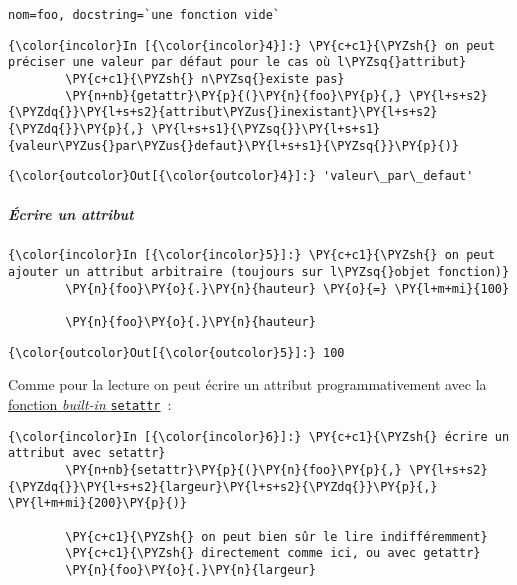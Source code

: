     \begin{Verbatim}[commandchars=\\\{\}]
nom=foo, docstring=`une fonction vide`

    \end{Verbatim}

    \begin{Verbatim}[commandchars=\\\{\}]
{\color{incolor}In [{\color{incolor}4}]:} \PY{c+c1}{\PYZsh{} on peut préciser une valeur par défaut pour le cas où l\PYZsq{}attribut}
        \PY{c+c1}{\PYZsh{} n\PYZsq{}existe pas}
        \PY{n+nb}{getattr}\PY{p}{(}\PY{n}{foo}\PY{p}{,} \PY{l+s+s2}{\PYZdq{}}\PY{l+s+s2}{attribut\PYZus{}inexistant}\PY{l+s+s2}{\PYZdq{}}\PY{p}{,} \PY{l+s+s1}{\PYZsq{}}\PY{l+s+s1}{valeur\PYZus{}par\PYZus{}defaut}\PY{l+s+s1}{\PYZsq{}}\PY{p}{)}
\end{Verbatim}


\begin{Verbatim}[commandchars=\\\{\}]
{\color{outcolor}Out[{\color{outcolor}4}]:} 'valeur\_par\_defaut'
\end{Verbatim}
            
    \hypertarget{uxe9crire-un-attribut}{%
\subparagraph{Écrire un attribut}\label{uxe9crire-un-attribut}}

    \begin{Verbatim}[commandchars=\\\{\}]
{\color{incolor}In [{\color{incolor}5}]:} \PY{c+c1}{\PYZsh{} on peut ajouter un attribut arbitraire (toujours sur l\PYZsq{}objet fonction)}
        \PY{n}{foo}\PY{o}{.}\PY{n}{hauteur} \PY{o}{=} \PY{l+m+mi}{100}
        
        \PY{n}{foo}\PY{o}{.}\PY{n}{hauteur}
\end{Verbatim}


\begin{Verbatim}[commandchars=\\\{\}]
{\color{outcolor}Out[{\color{outcolor}5}]:} 100
\end{Verbatim}
            
    Comme pour la lecture on peut écrire un attribut programmativement avec
la
\href{https://docs.python.org/3/library/functions.html\#setattr}{fonction
\emph{built-in} \texttt{setattr}}~:

    \begin{Verbatim}[commandchars=\\\{\}]
{\color{incolor}In [{\color{incolor}6}]:} \PY{c+c1}{\PYZsh{} écrire un attribut avec setattr}
        \PY{n+nb}{setattr}\PY{p}{(}\PY{n}{foo}\PY{p}{,} \PY{l+s+s2}{\PYZdq{}}\PY{l+s+s2}{largeur}\PY{l+s+s2}{\PYZdq{}}\PY{p}{,} \PY{l+m+mi}{200}\PY{p}{)}
        
        \PY{c+c1}{\PYZsh{} on peut bien sûr le lire indifféremment}
        \PY{c+c1}{\PYZsh{} directement comme ici, ou avec getattr}
        \PY{n}{foo}\PY{o}{.}\PY{n}{largeur}
\end{Verbatim}


